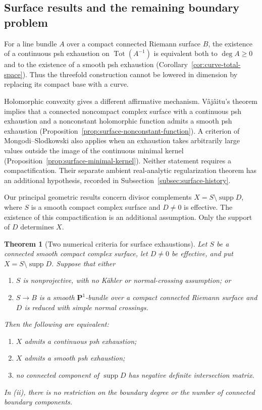 \documentclass[11pt]{amsart}
\newtheorem{theorem}{Theorem}[section]
\theoremstyle{definition}
\theoremstyle{remark}
\numberwithin{equation}{section}
\newcommand{\PP}{\mathbf P}
\newcommand{\Tot}{\operatorname{Tot}}
\newcommand{\supp}{\operatorname{supp}}
\begin{document}
\subsection{Surface results and the remaining boundary problem}

For a line bundle $A$ over a compact connected Riemann surface $B$,
the existence of a continuous psh exhaustion on $\Tot(A^{-1})$ is
equivalent both to $\deg A\ge0$ and to the existence of a smooth psh
exhaustion (Corollary~\ref{cor:curve-total-space}). Thus the threefold
construction cannot be lowered in dimension by replacing its compact
base with a curve.

Holomorphic convexity gives a different affirmative mechanism.
V\^aj\^aitu's theorem \cite{Vajaitu2022} implies that a connected
noncompact complex surface with a continuous psh exhaustion and a
nonconstant holomorphic function admits a smooth psh exhaustion
(Proposition~\ref{prop:surface-nonconstant-function}). A criterion of
Mongodi--Slodkowski also applies when an exhaustion takes arbitrarily
large values outside the image of the continuous minimal kernel
(Proposition~\ref{prop:surface-minimal-kernel}). Neither statement
requires a compactification. Their separate ambient real-analytic
regularization theorem has an additional hypothesis, recorded in
Subsection~\ref{subsec:surface-history}.

Our principal geometric results concern divisor complements
$X=S\setminus\supp D$, where $S$ is a smooth compact complex surface
and $D\ne0$ is effective. The existence of this compactification is an
additional assumption. Only the support of $D$ determines $X$.

\begin{theorem}[Two numerical criteria for surface exhaustions]
\label{thm:surface-criteria-intro}
Let $S$ be a connected smooth compact complex surface, let $D\ne0$
be effective, and put $X=S\setminus\supp D$. Suppose that either
\begin{enumerate}[label=\textup{(\roman*)},leftmargin=2.5em]
\item $S$ is nonprojective, with no K\"ahler or normal-crossing assumption; or
\item $S\to B$ is a smooth $\PP^1$-bundle over a compact connected
Riemann surface and $D$ is reduced with simple normal crossings.
\end{enumerate}
Then the following are equivalent:
\begin{enumerate}[label=\textup{(\alph*)},leftmargin=2.5em]
\item $X$ admits a continuous psh exhaustion;
\item $X$ admits a smooth psh exhaustion;
\item no connected component of $\supp D$ has negative definite
intersection matrix.
\end{enumerate}
In \textup{(ii)}, there is no restriction on the boundary degree or
the number of connected boundary components.
\end{theorem}
\end{document}
